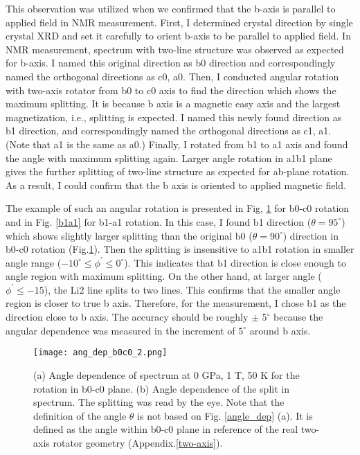 \documentclass[a4,10.5pt]{report}
\begin{document}
This observation was utilized when we confirmed that the b-axis is parallel to applied field in NMR measurement.
First, I determined crystal direction by single crystal XRD and set it carefully to orient b-axis to be parallel to applied field. 
In NMR measurement, spectrum with two-line structure was observed as expected for b-axis.
I named this original direction as b0 direction and correspondingly named the orthogonal directions as c0, a0.
Then, I conducted angular rotation with two-axis rotator from b0 to c0 axis to find the direction which shows the maximum splitting.
It is because b axis is a magnetic easy axis and the largest magnetization, i.e., splitting is expected.
I named this newly found direction as b1 direction, and correspondingly named the orthogonal directions as c1, a1.
(Note that a1 is the same as a0.)
Finally, I rotated from b1 to a1 axis and found the angle with maximum splitting again.
Larger angle rotation in a1b1 plane gives the further splitting of two-line structure as expected for ab-plane rotation.
As a result, I could confirm that the b axis is oriented to applied magnetic field.

The example of such an angular rotation is presented in Fig, \ref{b0c0} for b0-c0 rotation and in Fig. \ref{b1a1} for b1-a1 rotation.
In this case, I found b1 direction ($\theta = 95^\circ$) which shows slightly larger splitting than the original b0 ($\theta = 90^\circ$) direction in b0-c0 rotation (Fig.\ref{b0c0}).
Then the splitting is insensitive to a1b1 rotation in smaller angle range ($-10^\circ \leq \phi^\prime \leq 0^\circ$).
This indicates that b1 direction is close enough to angle region with maximum splitting. 
On the other hand, at larger angle ($\phi^\prime \leq -15$), the Li2 line splits to two lines. 
This confirms that the smaller angle region is closer to true b axis.
Therefore, for the measurement, I chose b1 as the direction close to b axis. 
The accuracy should be roughly $\pm$ $5^\circ$ because the angular dependence was measured in the increment of $5^\circ$ around b axis.

\begin{figure}
  \centering
  \texttt{[image: ang\_dep\_b0c0\_2.png]}
  \caption{(a) Angle dependence of spectrum at 0 GPa, 1 T, 50 K for the rotation in b0-c0 plane.
  (b) Angle dependence of the split in spectrum. The splitting was read by the eye.
  Note that the definition of the angle $\theta$ is not based on Fig. \ref{angle_dep} (a).
  It is defined as the angle within b0-c0 plane in reference of the real two-axis rotator geometry (Appendix.\ref{two-axis}).}
  \label{b0c0}
\end{figure}
\end{document}
